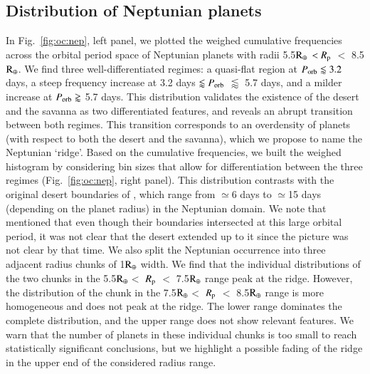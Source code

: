 \documentclass[]{aa}
\begin{document}
\subsection{Distribution of Neptunian planets}
\label{sec:oc_nep}

In Fig.~\ref{fig:oc:nep}, left panel, we plotted the weighed cumulative frequencies across the orbital period space of Neptunian planets with radii 5.5$\rm R_{\oplus}$ $<R_{\rm p}$ $<$ 8.5$\rm R_{\oplus}$. We find three well-differentiated regimes: a quasi-flat region at $P_{\rm orb} \lessapprox 3.2$ days, a steep frequency increase at 3.2 days $ \lessapprox P_{\rm orb}$ $\lessapprox$ 5.7 days, and a milder increase at $P_{\rm orb} \gtrapprox$ 5.7 days. This distribution validates the existence of the desert and the savanna as two differentiated features, and reveals an abrupt transition between both regimes. This transition corresponds to an overdensity of planets (with respect to both the desert and the savanna), which we propose to name the Neptunian `ridge'. Based on the cumulative frequencies, we built the weighed histogram by considering bin sizes that allow for differentiation between the three regimes (Fig.~\ref{fig:oc:nep}, right panel). This distribution contrasts with the original desert boundaries of \citet{2016A&A...589A..75M}, which range from $\simeq$6 days to $\simeq$15 days (depending on the planet radius) in the Neptunian domain. We note that \citet{2016A&A...589A..75M} mentioned that even though their boundaries intersected at this large orbital period, it was not clear that the desert extended up to it
since the picture was not clear by that time. We also split the Neptunian occurrence into three adjacent radius chunks of 1$\rm R_{\oplus}$ width. We find that the individual distributions of the two chunks in the 5.5$\rm R_{\oplus}$$<$ $R_{\rm p}$ $<$ 7.5$\rm R_{\oplus}$ range peak at the ridge. However, the distribution of the chunk in the 7.5$\rm R_{\oplus}$$<$ $R_{\rm p}$ $<$ 8.5$\rm R_{\oplus}$ range is more homogeneous and does not peak at the ridge. The lower range dominates the complete distribution, and the upper range does not show relevant features. We warn that the number of planets in these individual chunks is too small to reach statistically significant conclusions, but we highlight a possible fading of the ridge in the upper end of the considered radius range. 
\end{document}

